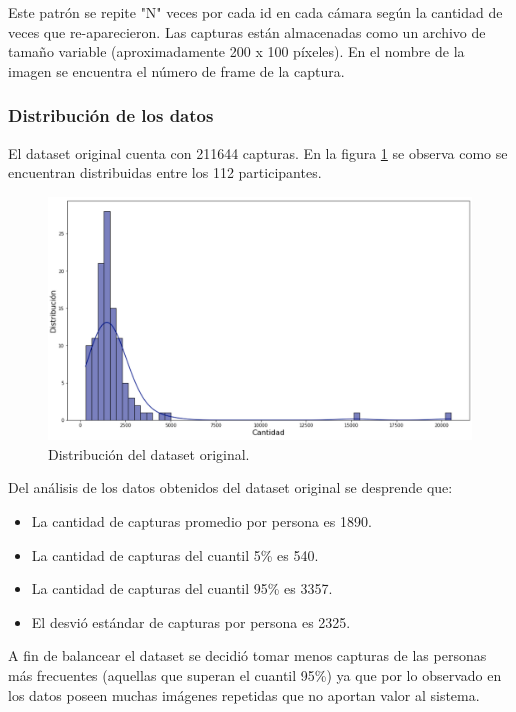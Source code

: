 Este patrón se repite "N" veces por cada id en cada cámara según la cantidad de veces que re-aparecieron. Las capturas están almacenadas como un archivo  de tamaño variable (aproximadamente 200 x 100 píxeles). En el nombre de la imagen se encuentra el número de frame de la captura.

\newpage

\subsubsection{Distribución de los datos}

El dataset original cuenta con 211644 capturas. En la figura \ref{fig:distribucionOriginal} se observa como se encuentran distribuidas entre los 112 participantes.

\begin{figure}[ht]
	\centering
	\includegraphics[scale=.50]{./Figures/distribucionOriginal.png}
	\caption{Distribución del dataset original.}
	\label{fig:distribucionOriginal}
\end{figure}

Del análisis de los datos obtenidos del dataset original se desprende que:
\begin{itemize}
\item La cantidad de capturas promedio por persona es 1890.
\item La cantidad de capturas del cuantil 5\% es 540.
\item La cantidad de capturas del cuantil 95\% es 3357.
\item El desvió estándar de capturas por persona es 2325.
\end{itemize}

A fin de balancear el dataset se decidió tomar menos capturas de las personas más frecuentes (aquellas que superan el cuantil 95\%) ya que por lo observado en los datos poseen muchas imágenes repetidas que no aportan valor al sistema.

